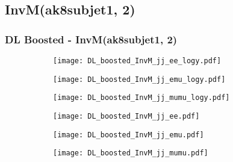 \documentclass[aspectratio=169,8pt]{beamer}
\begin{document}
\subsection{InvM(ak8subjet1, 2)}
\begin{frame}
\frametitle{DL Boosted - InvM(ak8subjet1, 2)}
\begin{figure}
\captionsetup[subfigure]{labelformat=empty}
\begin{subfigure}{0.32\textwidth}
\texttt{[image: DL\_boosted\_InvM\_jj\_ee\_logy.pdf]}
\vspace*{-0.15cm}
\end{subfigure}
\hfil
\begin{subfigure}{0.32\textwidth}
\texttt{[image: DL\_boosted\_InvM\_jj\_emu\_logy.pdf]}
\vspace*{-0.15cm}
\end{subfigure}
\hfil
\begin{subfigure}{0.32\textwidth}
\texttt{[image: DL\_boosted\_InvM\_jj\_mumu\_logy.pdf]}
\vspace*{-0.15cm}
\end{subfigure}
\hfil
\begin{subfigure}{0.32\textwidth}
\texttt{[image: DL\_boosted\_InvM\_jj\_ee.pdf]}
\vspace*{-0.15cm}
\end{subfigure}
\hfil
\begin{subfigure}{0.32\textwidth}
\texttt{[image: DL\_boosted\_InvM\_jj\_emu.pdf]}
\vspace*{-0.15cm}
\end{subfigure}
\hfil
\begin{subfigure}{0.32\textwidth}
\texttt{[image: DL\_boosted\_InvM\_jj\_mumu.pdf]}
\vspace*{-0.15cm}
\end{subfigure}
\hfil
\end{figure}
\end{frame}
\newpage
\end{document}
